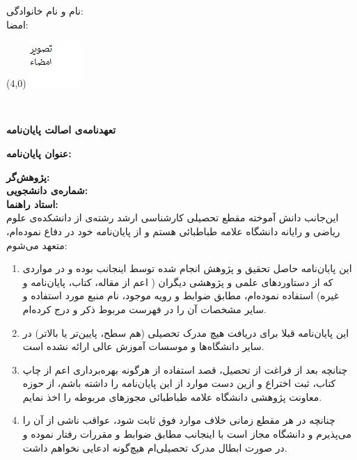 \vspace{1cm}
\begin{center}
{ نام و نام خانوادگی:} \faAuthor \\ 
 \hspace{-1cm} امضا:\\
 

\begin{textblock}{3}(4,0)
\includegraphics[scale=2]{sign.jpg}
\end{textblock}
 
\vspace{1cm}
     \fadate
\end{center}
  \mbox{ }
%
\newpage
 \thispagestyle{empty}
\setlength{\baselineskip}{1.1\baselineskip}
\begin{center}
\textbf{
تعهدنامه‌ی اصالت پایان‌نامه}   

 \vspace{.8cm}

\textbf{ عنوان پایان‌نامه:}  \fatitle  \\  
\end{center}
\vspace{.5cm}
\textbf{ پژوهش‌گر:} \faAuthor \\  
 \textbf{شماره‌ی دانشجویی:} \stuno \\
\textbf{ استاد راهنما:} \fasupervisor  \vspace{.5cm}    \\  

این‌جانب \textbf{\faAuthor} دانش آموخته مقطع تحصیلی کارشناسی ارشد رشته‌ی \textbf{\famajor} از دانشکده‌ی علوم ریاضی و رایانه دانشگاه علامه طباطبائی هستم و از پایان‌نامه خود در \fadate دفاع نموده‌ام، متعهد می‌شوم:
\begin{enumerate}
\item
این پایان‌نامه حاصل تحقیق و پژوهش انجام شده توسط اینجانب بوده و در مواردی که از دستاوردهای علمی و پژوهشی دیگران ( اعم از مقاله، کتاب، پایان‌نامه و غیره) استفاده نموده‌ام، مطابق ضوابط و رویه موجود، نام منبع مورد استفاده و سایر مشخصات آن را در فهرست مربوط ذکر و درج کرده‌ام.
\item
این پایان‌نامه قبلا برای دریافت هیچ مدرک تحصیلی (هم سطح، پایین‌تر یا بالاتر) در سایر دانشگاه‌ها و موسسات آموزش عالی ارائه نشده است.
\item
چنانچه بعد از فراغت از تحصیل، قصد استفاده از هرگونه بهره‌برداری اعم از چاپ کتاب، ثبت اختراع و ازین دست موارد از این پایان‌نامه را داشته باشم، از حوزه معاونت پژوهشی دانشگاه علامه طباطبائی مجوزهای مربوطه را اخذ نمایم.
\item
چنانچه در هر مقطع زمانی خلاف موارد فوق ثابت شود، عواقب ناشی از آن را می‌پذیرم و دانشگاه مجاز است با اینجانب مطابق ضوابط و مقررات رفتار نموده و در صورت ابطال مدرک تحصیلی‌ام هیچ‌گونه ادعایی نخواهم داشت.
\end{enumerate}

